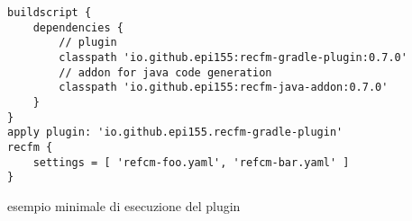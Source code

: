 \begin{elisting}[!htb]
\begin{verbatim}
buildscript {
    dependencies {
        // plugin
        classpath 'io.github.epi155:recfm-gradle-plugin:0.7.0'
        // addon for java code generation
        classpath 'io.github.epi155:recfm-java-addon:0.7.0'
    }
}
apply plugin: 'io.github.epi155.recfm-gradle-plugin'
recfm {
    settings = [ 'refcm-foo.yaml', 'refcm-bar.yaml' ]
}
\end{verbatim}
\caption{esempio minimale di esecuzione del plugin}
\label{lst:grd-xmpl}
\end{elisting}
